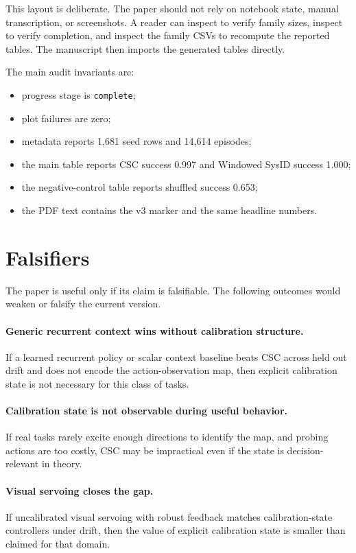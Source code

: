 \documentclass{article}
\begin{document}
This layout is deliberate. The paper should not rely on notebook state,
manual transcription, or screenshots. A reader can inspect
 to verify family sizes, inspect
 to verify completion, and inspect the family CSVs to
recompute the reported tables. The manuscript then imports the generated
tables directly.

The main audit invariants are:
\begin{itemize}[leftmargin=*]
\item progress stage is \texttt{complete};
\item plot failures are zero;
\item metadata reports 1,681 seed rows and 14,614 episodes;
\item the main table reports CSC success 0.997 and Windowed SysID success
1.000;
\item the negative-control table reports shuffled success 0.653;
\item the PDF text contains the v3 marker and the same headline numbers.
\end{itemize}

\section{Falsifiers}

The paper is useful only if its claim is falsifiable. The following outcomes
would weaken or falsify the current version.

\paragraph{Generic recurrent context wins without calibration structure.}
If a learned recurrent policy or scalar context baseline beats CSC across held
out drift and does not encode the action-observation map, then explicit
calibration state is not necessary for this class of tasks.

\paragraph{Calibration state is not observable during useful behavior.}
If real tasks rarely excite enough directions to identify the map, and probing
actions are too costly, CSC may be impractical even if the state is
decision-relevant in theory.

\paragraph{Visual servoing closes the gap.}
If uncalibrated visual servoing with robust feedback matches calibration-state
controllers under drift, then the value of explicit calibration state is
smaller than claimed for that domain.
\end{document}
